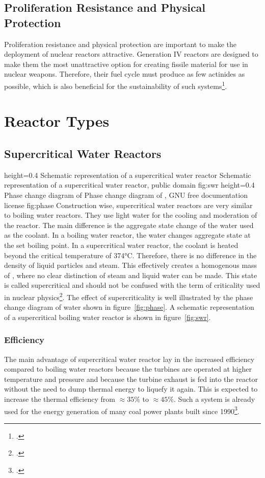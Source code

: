 \subsection{Proliferation Resistance and Physical Protection}
Proliferation resistance and physical protection are important to make the deployment of nuclear reactors
attractive. Generation IV reactors are designed to make them the most unattractive option for creating
fissile material for use in nuclear weapons. Therefore, their fuel cycle must produce as few actinides
as possible, which is also beneficial for the sustainability of such systems\footcite[39]{IVHandbook}.
\pagebreak
\section{Reactor Types}
\subsection{Supercritical Water Reactors}
    {height=0.4\textheight}
    {Schematic representation of a supercritical water reactor}
    {Schematic representation of a supercritical water reactor, public domain}
    {fig:swr}
    {height=0.4\textheight}
    {Phase change diagram of }
    {Phase change diagram of , GNU free documentation license}
    {fig:phase}
Construction wise, supercritical water reactors are very similar to boiling water reactors. They
use light water for the cooling and moderation of the reactor. The main
difference is the aggregate state change of the water used as the coolant. In a boiling water reactor, the
water changes aggregate state at the set boiling point. In a supercritical water reactor, the coolant
is heated beyond the critical temperature of 374°C. Therefore, there is no difference in the density
of liquid particles and steam. This effectively creates a homogenous mass of , where no clear
distinction of steam and liquid water can be made. This state is called supercritical and should
not be confused with the term of criticality used in nuclear physics\footcite[206-236]{IVHandbook}. The effect of supercriticality
is well illustrated by the phase change diagram of water shown in figure~\ref{fig:phase}.
A schematic representation of a supercritical boiling water reactor is shown in figure~\ref{fig:swr}.
\subsubsection{Efficiency}
The main advantage of supercritical water reactor lay in the increased efficiency compared to boiling
water reactors because the turbines are operated at higher temperature and pressure and because
the turbine exhaust is fed into the reactor without the need to dump thermal energy to liquefy it again.
This is expected to increase the thermal efficiency from $\approx35\%$ to $\approx45\%$. Such a system
is already used for the energy generation of many coal power plants built since 1990\footcite[30-51]{T4Gen}.
